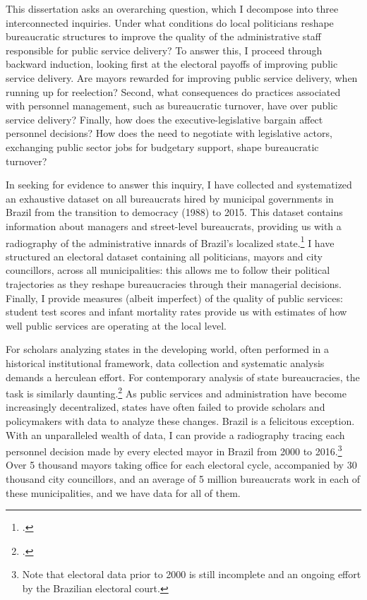 \documentclass[12pt,]{book}
\let\rmarkdownfootnote\footnote%
\def\footnote{\protect\rmarkdownfootnote}
\begin{document}
This dissertation asks an overarching question, which I decompose into three interconnected inquiries. Under what conditions do local politicians reshape bureaucratic structures to improve the quality of the administrative staff responsible for public service delivery? To answer this, I proceed through backward induction, looking first at the electoral payoffs of improving public service delivery. Are mayors rewarded for improving public service delivery, when running up for reelection? Second, what consequences do practices associated with personnel management, such as bureaucratic turnover, have over public service delivery? Finally, how does the executive-legislative bargain affect personnel decisions? How does the need to negotiate with legislative actors, exchanging public sector jobs for budgetary support, shape bureaucratic turnover?

In seeking for evidence to answer this inquiry, I have collected and systematized an exhaustive dataset on all bureaucrats hired by municipal governments in Brazil from the transition to democracy (1988) to 2015. This dataset contains information about managers and street-level bureaucrats, providing us with a radiography of the administrative innards of Brazil's localized state.\footnote{\citet{fukuyama_what_2013}.} I have structured an electoral dataset containing all politicians, mayors and city councillors, across all municipalities: this allows me to follow their political trajectories as they reshape bureaucracies through their managerial decisions. Finally, I provide measures (albeit imperfect) of the quality of public services: student test scores and infant mortality rates provide us with estimates of how well public services are operating at the local level.

For scholars analyzing states in the developing world, often performed in a historical institutional framework, data collection and systematic analysis demands a herculean effort. For contemporary analysis of state bureaucracies, the task is similarly daunting.\footnote{\citet{fukuyama_what_2013}.} As public services and administration have become increasingly decentralized, states have often failed to provide scholars and policymakers with data to analyze these changes. Brazil is a felicitous exception. With an unparalleled wealth of data, I can provide a radiography tracing each personnel decision made by every elected mayor in Brazil from 2000 to 2016.\footnote{Note that electoral data prior to 2000 is still incomplete and an ongoing effort by the Brazilian electoral court.} Over 5 thousand mayors taking office for each electoral cycle, accompanied by 30 thousand city councillors, and an average of 5 million bureaucrats work in each of these municipalities, and we have data for all of them.
\end{document}
